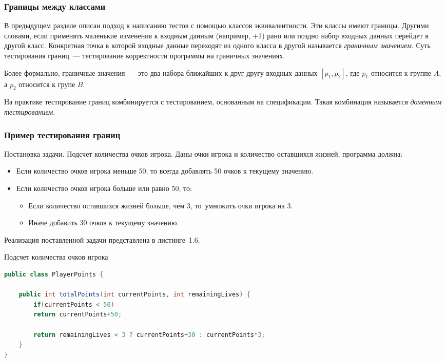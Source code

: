 \subsubsection{Границы между классами} 

В предыдущем разделе описан подход к написанию тестов с помощью классов эквивалентности. Эти классы имеют границы. Другими словами, если применять маленькие изменения к входным данным (например, +1) рано или поздно набор входных данных перейдет в другой класс. Конкретная точка в которой входные данные переходят из одного класса в другой называется \textit{граничным значением}. Суть тестирования границ~--- тестирование корректности программы на граничных значениях. 

Более формально, граничные значения~--- это два набора ближайших к друг другу входных данных \([p_1, p_2]\), где \(p_1\) относится к группе \(A\), а \(p_2\) относится к групе \(B\).
 
На практике тестирование границ комбинируется с тестированием, основанным на спецификации. Такая комбинация называется \textit{доменным тестированием}.
 
\subsubsection{Пример тестирования границ} 

Постановка задачи. Подсчет количества очков игрока. Даны очки игрока и количество оставшихся жизней, программа должна:

\begin{itemize}
	\item Если количество очков игрока меньше 50, то всегда добавлять 50 очков к текущему значению.
	\item Если количество очков игрока больше или равно 50, то:
	\begin{itemize}
		\item Если количество оставшихся жизней больше, чем 3, то~умножить очки игрока на 3.
		\item Иначе добавить 30 очков к текущему значению.
	\end{itemize}
\end{itemize}

Реализация поставленной задачи представлена в листинге~1.6.

\begin{ListingEnv}[!h]%
	\captiondelim{ } %
	\caption{Подсчет количества очков игрока}
	\begin{lstlisting}[language={Java}]
public class PlayerPoints {
	
	public int totalPoints(int currentPoints, int remainingLives) {
		if(currentPoints < 50)
		return currentPoints+50;
		
		return remainingLives < 3 ? currentPoints+30 : currentPoints*3;
	}
}
	\end{lstlisting}
\end{ListingEnv}%

